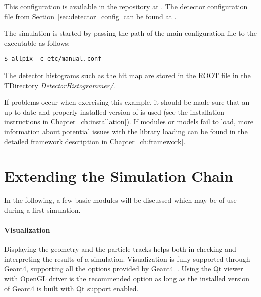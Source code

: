 This configuration is available in the repository at .
The detector configuration file from Section~\ref{sec:detector_config} can be found at .

The simulation is started by passing the path of the main configuration file to the  executable as follows:
\begin{verbatim}
$ allpix -c etc/manual.conf
\end{verbatim}
The detector histograms such as the hit map are stored in the ROOT file  in the TDirectory \textit{DetectorHistogrammer/}.

If problems occur when exercising this example, it should be made sure that an up-to-date and properly installed version of \apsq is used (see the installation instructions in Chapter~\ref{ch:installation}).
If modules or models fail to load, more information about potential issues with the library loading can be found in the detailed framework description in Chapter~\ref{ch:framework}.

\section{Extending the Simulation Chain}
In the following, a few basic modules will be discussed which may be of use during a first simulation.

\paragraph{Visualization}
Displaying the geometry and the particle tracks helps both in checking and interpreting the results of a simulation.
Visualization is fully supported through Geant4, supporting all the options provided by Geant4~\cite{geant4vis}.
Using the Qt viewer with OpenGL driver is the recommended option as long as the installed version of Geant4 is built with Qt support enabled.

